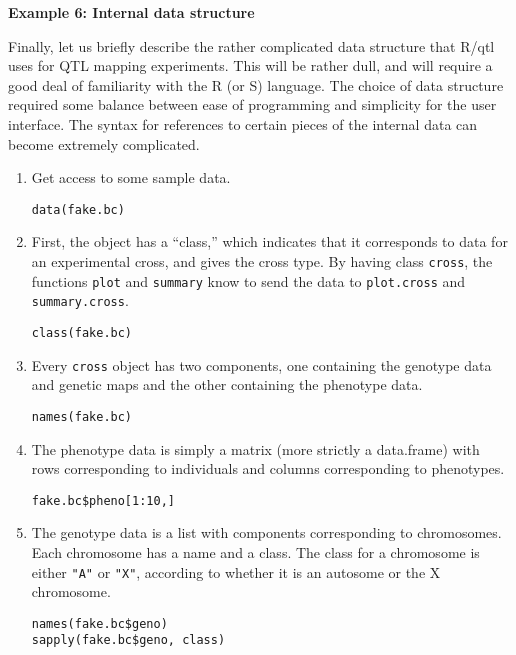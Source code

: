 \documentclass[10pt,letterpaper]{article}
\newcommand{\usercolor}{\color [named]{BlueViolet}}
\begin{document}
\newpage
\noindent \textbf{Example 6: Internal data structure} \vspace{6pt}
\nopagebreak

\label{example6}

\noindent Finally, let us briefly describe the rather complicated data
structure that R/qtl uses for QTL mapping experiments.  This will be
rather dull, and will require a good deal of familiarity with the R
(or S) language.  The choice of data structure required some balance
between ease of programming and simplicity for the user interface.
The syntax for references to certain pieces of the internal data can
become extremely complicated.

\begin{enumerate}

\item Get access to some sample data.

\usercolor \verb|data(fake.bc)| \normalcolor

\item First, the object has a ``class,'' which indicates that it
corresponds to data for an experimental cross, and gives the cross
type.  By having class \verb-cross-, the functions \verb-plot- and
\verb-summary- know to send the data to \verb-plot.cross- and
\verb-summary.cross-.

\usercolor \verb|class(fake.bc)| \normalcolor

\item Every \verb-cross- object has two components, one containing the
genotype data and genetic maps and the other containing the phenotype
data.

\usercolor \verb|names(fake.bc)| \normalcolor

\item The phenotype data is simply a matrix (more strictly a
data.frame) with rows corresponding to individuals and columns
corresponding to phenotypes.  

\usercolor \verb|fake.bc$pheno[1:10,]| \normalcolor %

\item  The genotype data is a list with components corresponding to
chromosomes.  Each chromosome has a name and a class.  The class for a
chromosome is either \verb-"A"- or \verb-"X"-, according to whether it
is an autosome or the X chromosome.  

\usercolor 
\verb|names(fake.bc$geno)| \\ %
\verb|sapply(fake.bc$geno, class)| %
\normalcolor


\end{enumerate}
\end{document}
